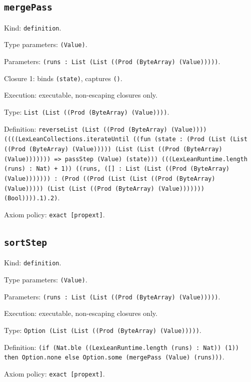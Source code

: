 \documentclass[11pt]{article}
\begin{document}
\subsection*{\texttt{mergePass}}
\noindent Kind: \texttt{definition}.\par
\noindent Type parameters: \texttt{(Value)}.\par
\noindent Parameters: \texttt{(runs : List (List ((Prod (ByteArray) (Value)))))}.\par
\noindent Closure 1: binds \texttt{(state)}, captures \texttt{()}.\par
\noindent Execution: executable, non-escaping closures only.\par
\noindent Type: \texttt{List (List ((Prod (ByteArray) (Value))))}.\par
\noindent Definition: \texttt{reverseList (List ((Prod (ByteArray) (Value)))) ((((LexLeanCollections.iterateUntil ((fun (state : (Prod (List (List ((Prod (ByteArray) (Value))))) (List (List ((Prod (ByteArray) (Value))))))) => passStep (Value) (state))) (((LexLeanRuntime.length (runs) : Nat) + 1)) ((runs, ([] : List (List ((Prod (ByteArray) (Value))))))) : (Prod ((Prod (List (List ((Prod (ByteArray) (Value))))) (List (List ((Prod (ByteArray) (Value))))))) (Bool)))).1).2)}.\par
\noindent Axiom policy: \texttt{exact [propext]}.\par
\subsection*{\texttt{sortStep}}
\noindent Kind: \texttt{definition}.\par
\noindent Type parameters: \texttt{(Value)}.\par
\noindent Parameters: \texttt{(runs : List (List ((Prod (ByteArray) (Value)))))}.\par
\noindent Execution: executable, non-escaping closures only.\par
\noindent Type: \texttt{Option (List (List ((Prod (ByteArray) (Value)))))}.\par
\noindent Definition: \texttt{(if (Nat.ble ((LexLeanRuntime.length (runs) : Nat)) (1)) then Option.none else Option.some (mergePass (Value) (runs)))}.\par
\noindent Axiom policy: \texttt{exact [propext]}.\par
\end{document}

